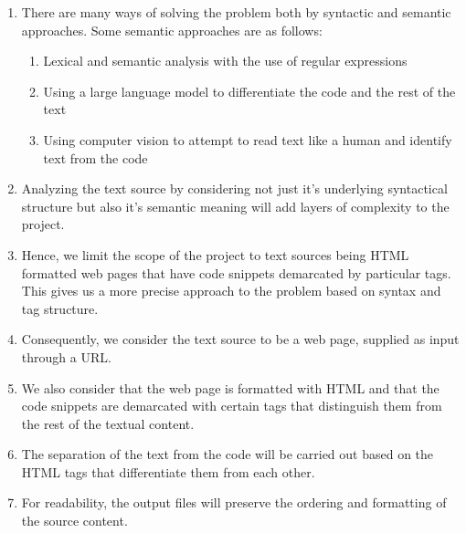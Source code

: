 \documentclass{scrreprt}
\begin{document}
\begin{enumerate}
    \item There are many ways of solving the problem both by syntactic and semantic approaches. Some semantic approaches are as follows:
        \begin{enumerate}
            \item Lexical and semantic analysis with the use of regular expressions
            \item Using a large language model to differentiate the code and the rest of the text 
            \item Using computer vision to attempt to read text like a human and identify text from the code
        \end{enumerate}
    \item Analyzing the text source by considering not just it's underlying syntactical structure but also it's semantic meaning will add layers of complexity to the project.
    \item Hence, we limit the scope of the project to text sources being HTML formatted web pages that have code snippets demarcated by particular tags. This gives us a more precise approach to the problem based on syntax and tag structure.
    \item Consequently, we consider the text source to be a web page, supplied as input through a URL.
    \item We also consider that the web page is formatted with HTML and that the code snippets are demarcated with certain tags that distinguish them from the rest of the textual content. 
    \item The separation of the text from the code will be carried out based on the HTML tags that differentiate them from each other.
    \item For readability, the output files will preserve the ordering and formatting of the source content.
\end{enumerate}



\end{document}
